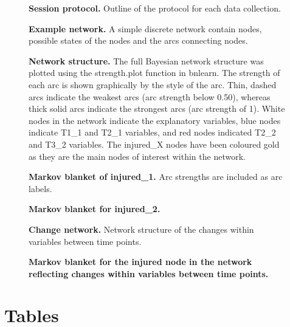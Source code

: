 \documentclass[
  english,
  man]{apa6}
\begin{document}
\begin{figure}[!h]
\caption{{\bf Session protocol.}
Outline of the protocol for each data collection.}
\label{fig:fig4}
\end{figure}

\begin{figure}[H]
\caption{{\bf Example network.}
A simple discrete network contain nodes, possible states of the nodes and the arcs connecting nodes.}
\label{fig:fig5}
\end{figure}

\begin{figure}[H]
\caption{{\bf Network structure.}
The full Bayesian network structure was plotted using the strength.plot function in bnlearn. The strength of each arc is shown graphically by the style of the arc. Thin, dashed arcs indicate the weakest arcs (arc strength below 0.50), whereas thick solid arcs indicate the strongest arcs (arc strength of 1). White nodes in the network indicate the explanatory variables, blue nodes indicate T1\_1 and T2\_1 variables, and red nodes indicated T2\_2 and T3\_2 variables. The injured\_X nodes have been coloured gold as they are the main nodes of interest within the network.}
\label{fig:fig6}
\end{figure}

\begin{figure}[H]
\caption{{\bf Markov blanket of injured\_1.}
Arc strengths are included as arc labels.}
\label{fig:fig7}
\end{figure}

\begin{figure}[H]
\caption{{\bf Markov blanket for injured\_2.} }
\label{fig:fig8}
\end{figure}

\begin{figure}[H]
\caption{{\bf Change network.}
Network structure of the changes within variables between time points.}
\label{fig:fig9}
\end{figure}

\begin{figure}[H]
\caption{{\bf Markov blanket for the injured node in the network reflecting changes within variables between time points.}}
\label{fig:fig10}
\end{figure}

\hypertarget{tables}{%
\section{Tables}\label{tables}}
\end{document}
